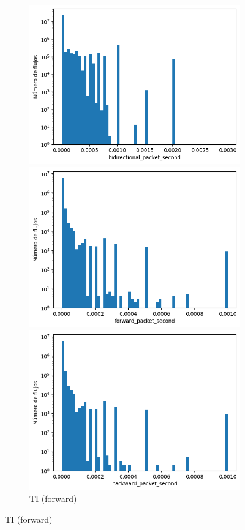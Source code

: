 \begin{figure}[H]
\begin{subfigure}[b]{0.26\textwidth}
        \includegraphics[width=\linewidth]{media/packet_pincer_toniot/bidirectional_packet_second_linear_x_log_y.png}
        \caption{TI (bidir.)}
        \includegraphics[width=\textwidth]{media/packet_pincer_botiot/forward_packet_second_linear_x_log_y.png}
        \caption{TI (forward)}
        \includegraphics[width=\textwidth]{media/packet_pincer_botiot/backward_packet_second_linear_x_log_y.png}

\end{subfigure}
\end{figure}

